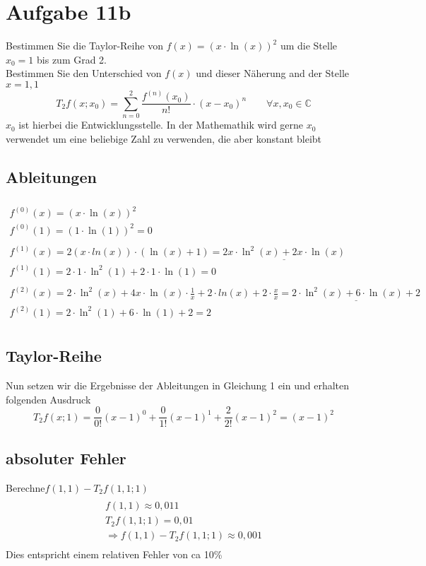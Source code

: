 \documentclass[18pt,a4paper]{article}
\begin{document}
\section*{Aufgabe 11b}
Bestimmen Sie die Taylor-Reihe von $f(x)=(x\cdot\ln(x))^2$ um die Stelle $x_0 = 1$ bis zum Grad 2.\\
Bestimmen Sie den Unterschied von $f(x)$ und dieser Näherung and der Stelle $x=1,1$
\begin{equation}
T_2f(x;x_0)= \sum_{n=0}^{2}\frac{f^{(n)}(x_0)}{n!} \cdot (x-x_0)^n \qquad\forall x,x_0 \in \mathbb{C}
\end{equation}
$x_0$ ist hierbei die Entwicklungsstelle. In der Mathemathik wird gerne $x_0$ verwendet um eine beliebige Zahl zu verwenden, die aber konstant bleibt
\subsection*{Ableitungen}
\begin{multline*}
\\
f^{(0)}(x)=(x\cdot\ln(x))^2\\
f^{(0)}(1)= (1\cdot\ln(1))^2 = 0\\
\\
f^{(1)}(x) = 2(x\cdot ln(x))\cdot(\ln(x)+1) = \underline{2x\cdot\ln^2(x)+ 2x\cdot \ln(x)}\\
f^{(1)}(1) = 2\cdot1\cdot\ln^2(1)+ 2\cdot 1\cdot \ln(1) = 0\\
\\
f^{(2)}(x) = 2\cdot\ln^2(x) + 4 x\cdot\ln(x) \cdot \frac{1}{x} + 2\cdot ln(x) + 2 \cdot \frac{x}{x} = \underline{ 2\cdot\ln^2(x) +  6 \cdot\ln(x) + 2}\\
f^{(2)}(1) = 2\cdot\ln^2(1) +  6 \cdot\ln(1) + 2 = 2\\
\end{multline*}
\subsection*{Taylor-Reihe}
Nun setzen wir die Ergebnisse der Ableitungen in Gleichung 1 ein und erhalten folgenden Ausdruck
\begin{equation*}
T_2f(x;1)= \frac{0}{0!}(x-1)^0 + \frac{0}{1!}(x-1)^1 + \frac{2}{2!}(x-1)^2 = (x-1)^2
\end{equation*}
\subsection*{absoluter Fehler}
Berechne$f(1,1) - T_2f(1,1;1)$\\
\begin{multline*}
\\
f(1,1) \approx 0,011\\
T_2f(1,1;1) = 0,01\\
\Rightarrow f(1,1) - T_2f(1,1;1) \approx 0,001\\
\end{multline*}
Dies entspricht einem relativen Fehler von ca 10\%
\end{document}
